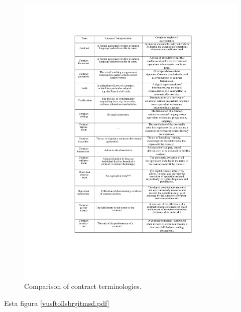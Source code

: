 \documentclass[12pt]{report} %
\begin{document}
\begin{itemize}
\begin{figure}
\centering
\includegraphics[width=0.85\columnwidth]{imagenes/terminosdiferentescontratos.pdf}
\caption{Comparison of contract terminologies.}
\label{terminosdiferentesontratos}
\end{figure} 


Esta figura \ref{vusftollsbrgitmsd.pdf}



\end{itemize}
\end{document}
